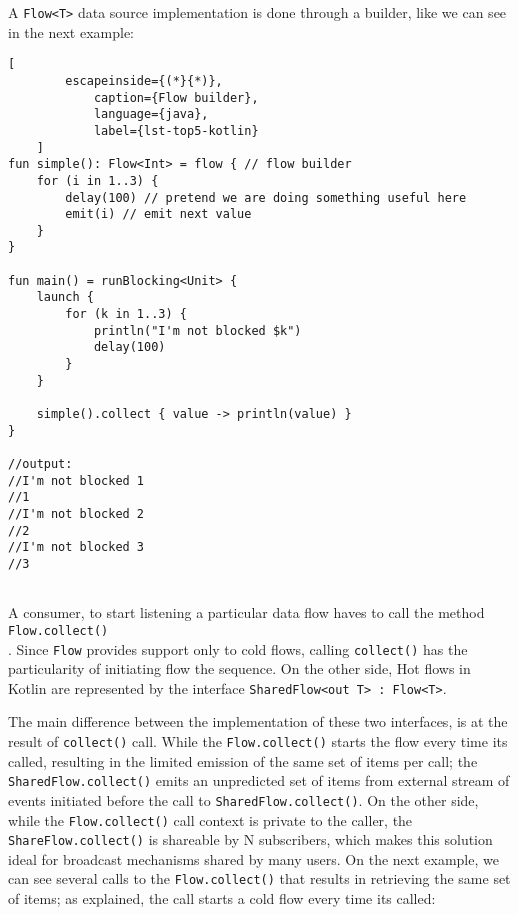 A \texttt{Flow<T>} data source implementation is done through a builder, like we can see in the next example:

\begin{center}
	\lstset{basicstyle=\scriptsize\ttfamily,frame=bottomline}
	\begin{lstlisting}[
		escapeinside={(*}{*)},
			caption={Flow builder},
			language={java},
			label={lst-top5-kotlin}
	]
fun simple(): Flow<Int> = flow { // flow builder
	for (i in 1..3) {
		delay(100) // pretend we are doing something useful here
		emit(i) // emit next value
	}
}

fun main() = runBlocking<Unit> {
	launch {
		for (k in 1..3) {
			println("I'm not blocked $k")
			delay(100)
		}
	}

	simple().collect { value -> println(value) } 
}

//output:
//I'm not blocked 1
//1
//I'm not blocked 2
//2
//I'm not blocked 3
//3
	
	\end{lstlisting}
\end{center}


A consumer, to start listening a particular data flow haves to call the method \texttt{Flow.collect()}\\. Since \texttt{Flow} provides support only to cold flows, calling \texttt{collect()} has the particularity of initiating flow the sequence.
On the other side, Hot flows in Kotlin are represented by the interface \texttt{SharedFlow<out T> : Flow<T>}. 

The main difference between the implementation of these two interfaces, is at the result of \texttt{collect()} call. 
While the \texttt{Flow.collect()} starts the flow every time its called, resulting in the limited emission of the same set of items per call; the \texttt{SharedFlow.collect()} emits an unpredicted set of items from external stream of events initiated before the call to \texttt{SharedFlow.collect()}.
On the other side, while the \texttt{Flow.collect()} call context is private to the caller, the \texttt{ShareFlow.collect()} is shareable by N subscribers, which makes this solution ideal for broadcast mechanisms shared by many users.
On the next example, we can see several calls to the \texttt{Flow.collect()} that results in retrieving the same set of items; as explained, the call starts a cold flow every time its called:

